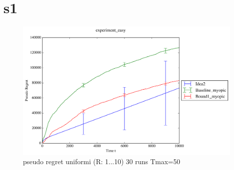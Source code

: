 \section{s1}
\begin{figure}[t]
	\includegraphics[width=15cm]{./images/experiment_easy ANALYTICS.png}
	\centering	
	\caption{pseudo regret uniformi (R: 1...10) 30 runs Tmax=50}
\end{figure}

